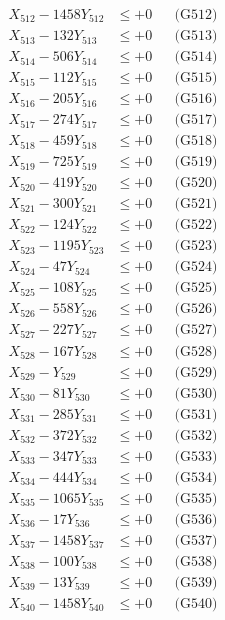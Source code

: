 \documentclass[a4paper,10pt]{article}
\begin{document}
{\begin{align}
X_{512} - 1458Y_{512} &\leq +0 && \text{(G512)} \\
X_{513} - 132Y_{513} &\leq +0 && \text{(G513)} \\
X_{514} - 506Y_{514} &\leq +0 && \text{(G514)} \\
X_{515} - 112Y_{515} &\leq +0 && \text{(G515)} \\
X_{516} - 205Y_{516} &\leq +0 && \text{(G516)} \\
X_{517} - 274Y_{517} &\leq +0 && \text{(G517)} \\
X_{518} - 459Y_{518} &\leq +0 && \text{(G518)} \\
X_{519} - 725Y_{519} &\leq +0 && \text{(G519)} \\
X_{520} - 419Y_{520} &\leq +0 && \text{(G520)} \\
\allowbreak
X_{521} - 300Y_{521} &\leq +0 && \text{(G521)} \\
X_{522} - 124Y_{522} &\leq +0 && \text{(G522)} \\
X_{523} - 1195Y_{523} &\leq +0 && \text{(G523)} \\
X_{524} - 47Y_{524} &\leq +0 && \text{(G524)} \\
X_{525} - 108Y_{525} &\leq +0 && \text{(G525)} \\
X_{526} - 558Y_{526} &\leq +0 && \text{(G526)} \\
X_{527} - 227Y_{527} &\leq +0 && \text{(G527)} \\
X_{528} - 167Y_{528} &\leq +0 && \text{(G528)} \\
X_{529} - Y_{529} &\leq +0 && \text{(G529)} \\
X_{530} - 81Y_{530} &\leq +0 && \text{(G530)} \\
\allowbreak
X_{531} - 285Y_{531} &\leq +0 && \text{(G531)} \\
X_{532} - 372Y_{532} &\leq +0 && \text{(G532)} \\
X_{533} - 347Y_{533} &\leq +0 && \text{(G533)} \\
X_{534} - 444Y_{534} &\leq +0 && \text{(G534)} \\
X_{535} - 1065Y_{535} &\leq +0 && \text{(G535)} \\
X_{536} - 17Y_{536} &\leq +0 && \text{(G536)} \\
X_{537} - 1458Y_{537} &\leq +0 && \text{(G537)} \\
X_{538} - 100Y_{538} &\leq +0 && \text{(G538)} \\
X_{539} - 13Y_{539} &\leq +0 && \text{(G539)} \\
X_{540} - 1458Y_{540} &\leq +0 && \text{(G540)} \\

\end{align}}
\end{document}
